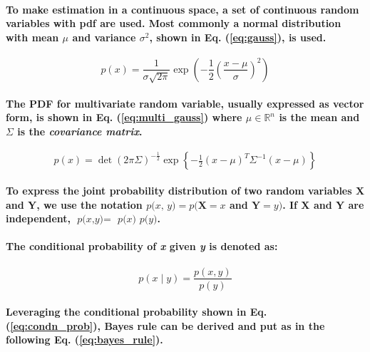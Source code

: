 \paragraph{\textnormal{To make estimation in a continuous space, a set of continuous random variables with \gls{pdf} are used. Most commonly a normal distribution with mean \textit{$\mu$} and variance \textit{$\sigma^{2}$}, shown in Eq. (\ref{eq:gauss}), is used. }}

\begin{equation}
	p(x) = \frac{1}{\sigma \sqrt{2\pi}} \exp\left( {-\frac{1}{2} \left( \frac{x - \mu}{\sigma} \right)^2}\right)
	\label{eq:gauss}
\end{equation}


\paragraph{\textnormal{The PDF for multivariate random variable, usually expressed as vector form, is shown in Eq. (\ref{eq:multi_gauss}) where $\mu \in \mathbb{R}^n$ is the mean and $\Sigma$ is the \textit{covariance matrix}.}}
\begin{equation}
	p(x) = \det\left( 2\pi\Sigma\right)^{-\frac{1}{2}} \exp\left\{ -\tfrac{1}{2}(x - \mu)^T\Sigma^{-1}(x - \mu)\right\}
		\label{eq:multi_gauss}
\end{equation}

\paragraph{\textnormal{To express the joint probability distribution of two random variables \textbf{X} and \textbf{Y}, we use the notation $\textit{p(x, y)} = p(\textbf{X}=x$ and $\textbf{Y}=y)$. If \textbf{X} and \textbf{Y} are independent, $\textit{p(x,y)} = $ $\textit{p(x)  p(y)} $.}}

\paragraph{\textnormal{The conditional probability of \textit{x} given \textit{y} is denoted as:}}
\begin{equation}
	p(x \mid y) = \frac{p(x, y)}{p(y)}
	\label{eq:condn_prob}
\end{equation}

\paragraph{\textnormal{Leveraging the conditional probability shown in Eq. (\ref{eq:condn_prob}), Bayes rule can be derived and put as in the following Eq. (\ref{eq:bayes_rule}).}}


